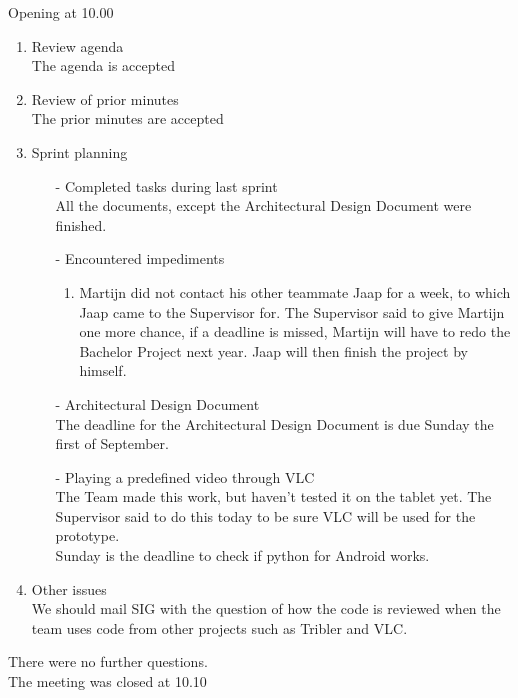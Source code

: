 \documentclass[pdftex, 12pt, a4paper]{report}
\begin{document}
\pagestyle{fancy}

Opening at 10.00

\begin{enumerate}
\item Review agenda\\
The agenda is accepted		
\item Review of prior minutes\\
The prior minutes are accepted

\item Sprint planning

\begin{enumerate}
\item[-] Completed tasks during last sprint\\
All the documents, except the Architectural Design Document were finished.
\item[-] Encountered impediments\\
\begin{enumerate}
	\item Martijn did not contact his other teammate Jaap for a week, to which Jaap came to the Supervisor for. The Supervisor said to give Martijn one more chance, if a deadline is missed, Martijn will have to redo the Bachelor Project next year. Jaap will then finish the project by himself.
\end{enumerate}
\item[-] Architectural Design Document \\
The deadline for the Architectural Design Document is due Sunday the first of September.
\item[-] Playing a predefined video through VLC\\
The Team made this work, but haven't tested it on the tablet yet. The Supervisor said to do this today to be sure VLC will be used for the prototype.\\

Sunday is the deadline to check if python for Android works.\\
\end{enumerate}
\item Other issues\\
We should mail SIG with the question of how the code is reviewed when the team uses code from other projects such as Tribler and VLC.
\end{enumerate}

There were no further questions.\\

The meeting was closed at 10.10\\
\end{document}
